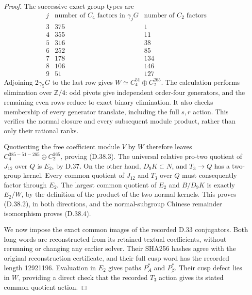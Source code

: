 \begin{proof}
The successive exact group types are
\[
 \begin{array}{c|rr}
 j&\text{number of }C_4\text{ factors in }\gamma_jG&
       \text{number of }C_2\text{ factors}\\\hline
 3&375&1\\
 4&355&11\\
 5&316&38\\
 6&252&85\\
 7&178&134\\
 8&106&146\\
 9&51&127
 \end{array}                                               \tag{D.38.11}
\]
Adjoining $2\gamma_5G$ to the last row gives
$W\simeq C_4^{51}\oplus C_2^{265}$.
The calculation performs elimination over $\mathbb Z/4$:
odd pivots give independent order-four generators,
and the remaining even rows reduce to exact binary
elimination. It also checks membership of every
generator translate, including the full $s,r$ action.
This verifies the normal closure and every subsequent
module product, rather than only their rational ranks.

Quotienting the free coefficient module $V$ by $W$
therefore leaves
$C_4^{385-51-265}\oplus C_2^{265}$, proving (D.38.3).
The universal relative pro-two quotient of $J_{12}$
over $Q$ is $E_2$, by D.37. On the other hand,
$D_9K\subset N$, and $T_3\to Q$ has a two-group kernel.
Every common quotient of $J_{12}$ and $T_3$ over $Q$
must consequently factor through $E_2$. The largest
common quotient of $E_2$ and $B/D_9K$ is exactly
$E_2/W$, by the definition of the product of the two
normal kernels. This proves (D.38.2), in both
directions, and the normal-subgroup Chinese remainder
isomorphism proves (D.38.4).

We now impose the exact common images of the recorded
D.33 conjugators. Both long words are reconstructed
from its retained textual coefficients, without
rerunning or changing any earlier solver. Their
SHA256 hashes agree with the original reconstruction
certificate, and their full cusp word has the
recorded length 12921196. Evaluation in $E_2$ gives
paths $P_A^*$ and $P_\beta^*$. Their cusp defect lies
in $W$, providing a direct check that the recorded
$T_3$ action gives its stated common-quotient action.


\end{proof}
